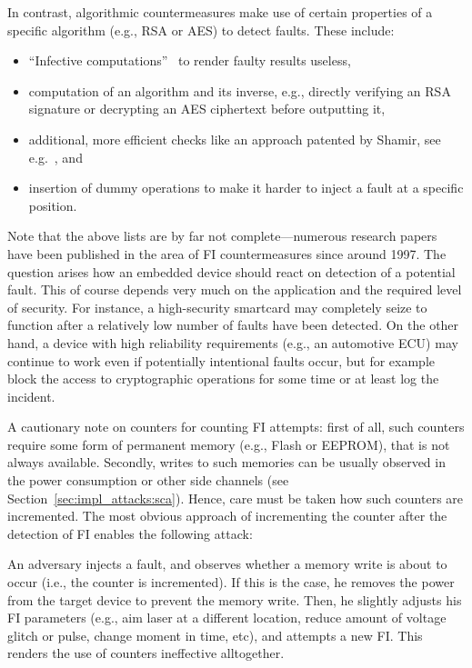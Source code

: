 In contrast, algorithmic countermeasures make use of certain properties of a specific algorithm (e.g., \ac{RSA} or \ac{AES}) to detect faults. These include:

\begin{itemize}
	\item ``Infective computations''~\cite{CIA10} to render faulty results useless,
	\item computation of an algorithm and its inverse, e.g., directly verifying an \ac{RSA} signature or decrypting an \ac{AES} ciphertext before outputting it,
	\item additional, more efficient checks like an approach patented by Shamir, see e.g.~\cite{joye2009protecting}, and
	\item insertion of dummy operations to make it harder to inject a fault at a specific position.
\end{itemize}

Note that the above lists are by far not complete---numerous research papers have been published in the area of \ac{FI} countermeasures since around 1997. 
The question arises how an embedded device should react on detection of a potential fault. This of course depends very much on the application and the required level of security. For instance, a high-security smartcard may completely seize to function after a relatively low number of faults have been detected. On the other hand, a device with high reliability requirements (e.g., an automotive \ac{ECU}) may continue to work even if potentially intentional faults occur, but for example block the access to cryptographic operations for some time or at least log the incident.

A cautionary note on counters for counting \ac{FI} attempts: first of all, such counters require some form of permanent memory (e.g., Flash or \ac{EEPROM}), that is not always available. Secondly, writes to such memories can be usually observed in the power consumption or other side channels (see Section~\ref{sec:impl_attacks:sca}). Hence, care must be taken how such counters are incremented. The most obvious approach of incrementing the counter after the detection of \ac{FI} enables the following attack:

An adversary injects a fault, and observes whether a memory write is about to occur (i.e., the counter is incremented). If this is the case, he removes the power from the target device to prevent the memory write. Then, he slightly adjusts his \ac{FI} parameters (e.g., aim laser at a different location, reduce amount of voltage glitch or pulse, change moment in time, etc), and attempts a new \ac{FI}. This renders the use of counters ineffective alltogether.


